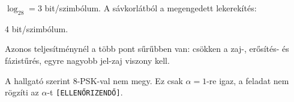 $\log_28=3$ bit/szimbólum. A sávkorlátból a megengedett lekerekítés:

\begin{center}\end{center}

\begin{center}\end{center}

4 bit/szimbólum.

\begin{center}\end{center}

Azonos teljesítménynél a több pont sűrűbben van: csökken a zaj-, erősítés- és fázistűrés, egyre nagyobb jel-zaj viszony kell.
\begin{figyelem}[Javítás]
A hallgató szerint 8-PSK-val nem megy. Ez csak $\alpha=1$-re igaz, a feladat nem rögzíti az $\alpha$-t \texttt{[ELLENŐRIZENDŐ]}.
\end{figyelem}
\begin{eredmeny}

\begin{center}\end{center}
\end{eredmeny}
